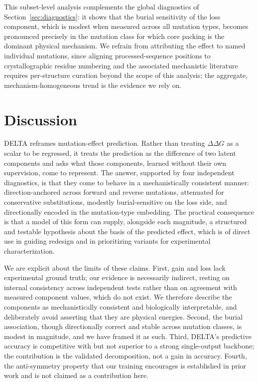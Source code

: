 \documentclass[11pt,a4paper]{article}
\theoremstyle{plain}
\theoremstyle{definition}
\begin{document}
This subset-level analysis complements the global diagnostics of Section~\ref{sec:diagnostics}: it shows that the burial sensitivity of the loss component, which is modest when measured across all mutation types, becomes pronounced precisely in the mutation class for which core packing is the dominant physical mechanism. We refrain from attributing the effect to named individual mutations, since aligning processed-sequence positions to crystallographic residue numbering and the associated mechanistic literature requires per-structure curation beyond the scope of this analysis; the aggregate, mechanism-homogeneous trend is the evidence we rely on.

\section{Discussion}
DELTA reframes mutation-effect prediction. Rather than treating $\Delta\Delta G$ as a
scalar to be regressed, it treats the prediction as the difference of two latent components and asks what those components, learned without their own supervision, come to represent. The answer, supported by four independent diagnostics, is that they come to behave in a mechanistically consistent manner: direction-anchored across forward and reverse mutations, attenuated for conservative substitutions, modestly burial-sensitive on the loss side, and directionally encoded in the mutation-type embedding. The practical consequence is that a model of this form can supply, alongside each
magnitude, a structured and testable hypothesis about the basis of the predicted effect, which is of direct use in guiding redesign and in prioritizing variants for experimental characterization.

We are explicit about the limits of these claims. First, gain and loss lack experimental ground truth; our evidence is necessarily indirect, resting on internal consistency across independent tests rather than on agreement with measured component values, which do not exist. We therefore describe the components as mechanistically consistent and biologically interpretable, and deliberately avoid asserting that they are physical energies. Second, the burial association, though directionally correct and stable across mutation classes, is modest in magnitude, and we have framed it as such. Third, DELTA's predictive accuracy is competitive with but not superior to a strong single-output backbone; the contribution is the validated decomposition, not a gain in accuracy. Fourth, the anti-symmetry property that our training encourages is established in prior work and is not claimed as a contribution here.
\end{document}
